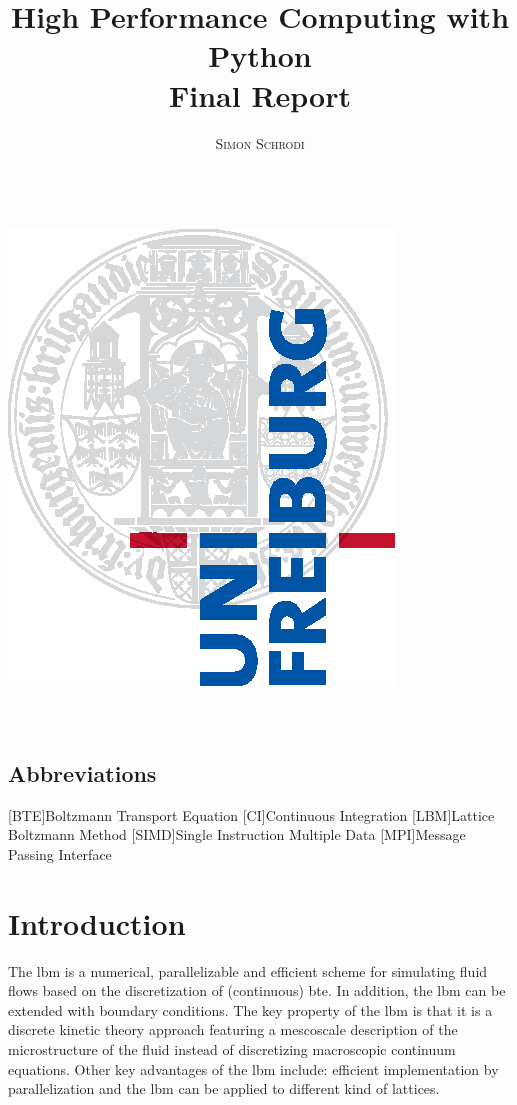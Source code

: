 \documentclass[a4paper,11pt, footsepline]{book}
\title{\Huge \textbf{High Performance Computing with Python} \vspace{4mm} \\ \huge Final Report}
\author{\textsc{Simon Schrodi} \\ \vspace{3mm}\text{4950789}  \\
\vspace{3mm}\text{schrodi@cs.uni-freiburg.de}}
\begin{document}
\makeatletter
    \begin{titlepage}
        \begin{center}
            \includegraphics[width=0.5\linewidth]{logos/Uni_Logo-Grundversion_E1_A4_CMYK.eps}\\[4ex]
            {\huge \bfseries  \@title }\\[2ex] 
            {\LARGE  \@author}\\[30ex] 
            {\large \@date}
        \end{center}
    \end{titlepage}
\makeatother
\thispagestyle{empty}
\newpage



\tableofcontents

\begin{acronym}
\section*{Abbreviations}
[BTE]{Boltzmann Transport Equation}
[CI]{Continuous Integration}
[LBM]{Lattice Boltzmann Method}
[SIMD]{Single Instruction Multiple Data}
[MPI]{Message Passing Interface}
\end{acronym}
\mainmatter

\chapter{Introduction}
The \acf{lbm} is a numerical, parallelizable and efficient scheme for simulating fluid flows based on the discretization of (continuous) \acf{bte}.\cite{McNamara.1988} In addition, the \ac{lbm} can be extended with boundary conditions. The key property of the \ac{lbm} is that it is a discrete kinetic theory approach featuring a mescoscale description of the microstructure of the fluid instead of discretizing macroscopic continuum equations. Other key advantages of the \ac{lbm} include: efficient implementation by parallelization and the \ac{lbm} can be applied to different kind of lattices.
\end{document}
